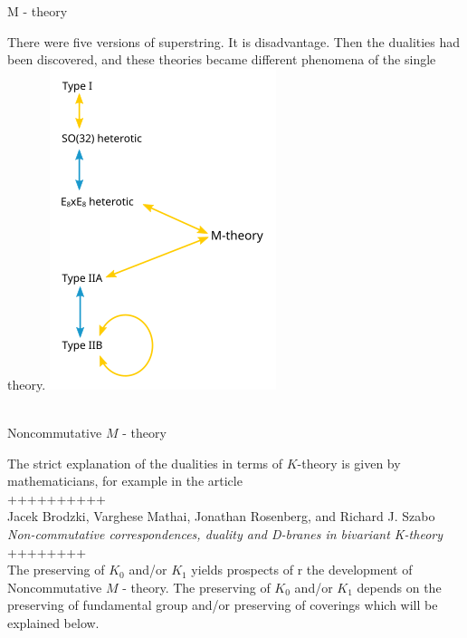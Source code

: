\documentclass{beamer}
\theoremstyle{plain}
\newtheorem{empt}{}
\begin{document}
\begin{frame}
\begin{center}
\huge{M - theory} 
\end{center}
There were five versions  of \alert{superstring}. It is disadvantage. Then the \alert{dualities} had been discovered, and these theories became different phenomena of the single theory.
\includegraphics[scale=0.5]{StringTheoryDualities.png}
\end{frame}
\begin{frame}
	$~$\\
\centering	\huge{Noncommutative $M$ - theory} \normalsize\\
\raggedright	The strict explanation of the \alert{dualities} in terms of $K$-theory is given by mathematicians, for example in the  article \\
++++++++++\\	
	Jacek Brodzki, Varghese Mathai, Jonathan Rosenberg, and
	Richard J. Szabo
\textit{Non-commutative
correspondences, duality and
D-branes in bivariant K-theory}
\\++++++++\\
The preserving of $K_0$ and/or $K_1$ yields prospects of r the development of \alert{Noncommutative $M$ - theory}.
The preserving of $K_0$ and/or $K_1$ depends on the \alert{preserving of fundamental group} and/or \alert{preserving of coverings} which will be explained below.


\end{frame}
\end{document}
